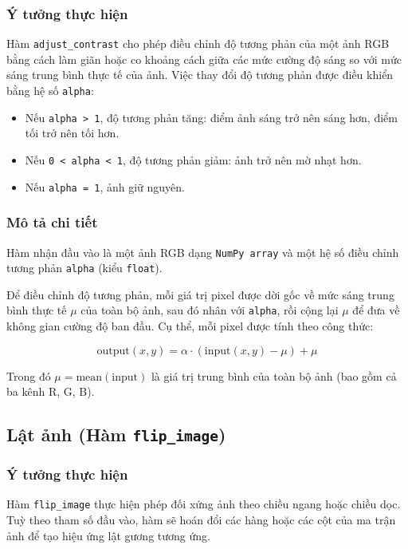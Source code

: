 \subsubsection*{Ý tưởng thực hiện}

Hàm \texttt{adjust\_contrast} cho phép điều chỉnh độ tương phản của một ảnh RGB bằng cách làm giãn hoặc co khoảng cách giữa các mức cường độ sáng so với mức sáng trung bình thực tế của ảnh. Việc thay đổi độ tương phản được điều khiển bằng hệ số \texttt{alpha}:
\begin{itemize}
  \item Nếu \texttt{alpha > 1}, độ tương phản tăng: điểm ảnh sáng trở nên sáng hơn, điểm tối trở nên tối hơn.
  \item Nếu \texttt{0 < alpha < 1}, độ tương phản giảm: ảnh trở nên mờ nhạt hơn.
  \item Nếu \texttt{alpha = 1}, ảnh giữ nguyên.
\end{itemize}

\subsubsection*{Mô tả chi tiết}

Hàm nhận đầu vào là một ảnh RGB dạng \texttt{NumPy array} và một hệ số điều chỉnh tương phản \texttt{alpha} (kiểu \texttt{float}).

Để điều chỉnh độ tương phản, mỗi giá trị pixel được dời gốc về mức sáng trung bình thực tế \( \mu \) của toàn bộ ảnh, sau đó nhân với \texttt{alpha}, rồi cộng lại \( \mu \) để đưa về không gian cường độ ban đầu. Cụ thể, mỗi pixel được tính theo công thức:

\[
  \text{output}(x, y) = \alpha \cdot (\text{input}(x, y) - \mu) + \mu
\]

Trong đó \( \mu = \text{mean}(\text{input}) \) là giá trị trung bình của toàn bộ ảnh (bao gồm cả ba kênh R, G, B).

\subsection{Lật ảnh (Hàm \texttt{flip\_image})}

\subsubsection*{Ý tưởng thực hiện}

Hàm \texttt{flip\_image} thực hiện phép đối xứng ảnh theo chiều ngang hoặc chiều dọc. Tuỳ theo tham số đầu vào, hàm sẽ hoán đổi các hàng hoặc các cột của ma trận ảnh để tạo hiệu ứng lật gương tương ứng.

